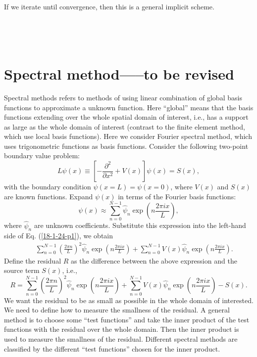 \documentclass{article}
\begin{document}
If we iterate until convergence, then this is a general implicit scheme.

\

\

\section{Spectral method-----to be revised}

Spectral methods refers to methods of using linear combination of global basis
functions to approximate a unknown function. Here ``global'' means that the
basis functions extending over the whole spatial domain of interest, i.e., has
a support as large as the whole domain of interest (contrast to the finite
element method, which use local basis functions). Here we consider Fourier
spectral method, which uses trigonometric functions as basis functions.
Consider the following two-point boundary value problem:
\begin{equation}
  \label{18-1-24-p1} L \psi (x) \equiv \left[ - \frac{\partial^2}{\partial
  x^2} + V (x) \right] \psi (x) = S (x),
\end{equation}
with the boundary condition $\psi (x = L) = \psi (x = 0)$, where $V (x)$ and
$S (x)$ are known functions. Expand $\psi (x)$ in terms of the Fourier basis
functions:
\begin{equation}
  \psi (x) \approx \sum_{n = 0}^{N - 1} \hat{\psi}_n \exp \left( n \frac{2 \pi
  i x}{L} \right),
\end{equation}
where $\hat{\psi}_n$ are unknown coefficients. Substitute this expression into
the left-hand side of Eq. (\ref{18-1-24-p1}), we obtain
\begin{eqnarray}
  &  & \sum_{n = 0}^{N - 1} \left( \frac{2 \pi n}{L} \right)^2 \hat{\psi}_n
  \exp \left( n \frac{2 \pi i x}{L} \right) + \sum_{n = 0}^{N - 1} V (x)
  \hat{\psi}_n \exp \left( n \frac{2 \pi i x}{L} \right) . 
\end{eqnarray}
Define the residual $R$ as the difference between the above expression and the
source term $S (x)$, i.e.,
\begin{equation}
  R = \sum_{n = 0}^{N - 1} \left( \frac{2 \pi n}{L} \right)^2 \hat{\psi}_n
  \exp \left( n \frac{2 \pi i x}{L} \right) + \sum_{n = 0}^{N - 1} V (x)
  \hat{\psi}_n \exp \left( n \frac{2 \pi i x}{L} \right) - S (x) .
\end{equation}
We want the residual to be as small as possible in the whole domain of
interested. We need to define how to measure the smallness of the residual. A
general method is to choose some ``test functions'' and take the inner product
of the test functions with the residual over the whole domain. Then the inner
product is used to measure the smallness of the residual. Different spectral
methods are classified by the different ``test functions'' chosen for the
inner product.
\end{document}
